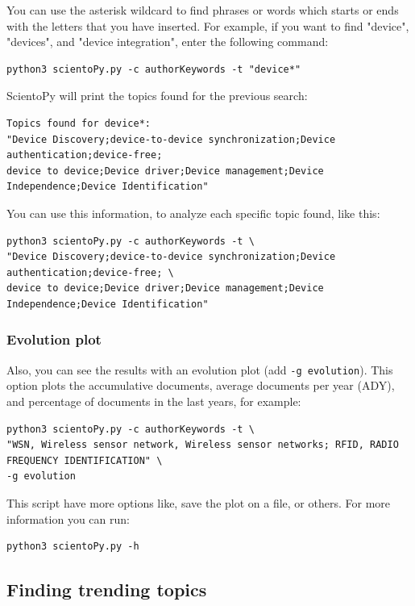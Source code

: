 \documentclass[10pt,letterpaper]{article}
\begin{document}
You can use the asterisk wildcard to find phrases or words which starts or ends with the letters that you have inserted. For example, if you want to find "device", "devices", and "device integration", enter the following command: 

\begin{verbatim}
python3 scientoPy.py -c authorKeywords -t "device*"
\end{verbatim}

ScientoPy will print the topics found for the previous search: 

\begin{verbatim}
Topics found for device*:
"Device Discovery;device-to-device synchronization;Device authentication;device-free;
device to device;Device driver;Device management;Device Independence;Device Identification"
\end{verbatim}

You can use this information, to analyze each specific topic found, like this: 

\begin{verbatim}
python3 scientoPy.py -c authorKeywords -t \
"Device Discovery;device-to-device synchronization;Device authentication;device-free; \
device to device;Device driver;Device management;Device Independence;Device Identification"
\end{verbatim}

\subsubsection{Evolution plot}

Also, you can see the results with an evolution plot (add \verb|-g evolution|). This option plots the accumulative documents, average documents per year (ADY), and percentage of documents in the last years, for example:

\begin{verbatim}
python3 scientoPy.py -c authorKeywords -t \
"WSN, Wireless sensor network, Wireless sensor networks; RFID, RADIO FREQUENCY IDENTIFICATION" \
-g evolution
\end{verbatim}

This script have more options like, save the plot on a file, or others. For more information you can run:

\begin{verbatim}
python3 scientoPy.py -h
\end{verbatim}

\subsection{Finding trending topics}
\end{document}

